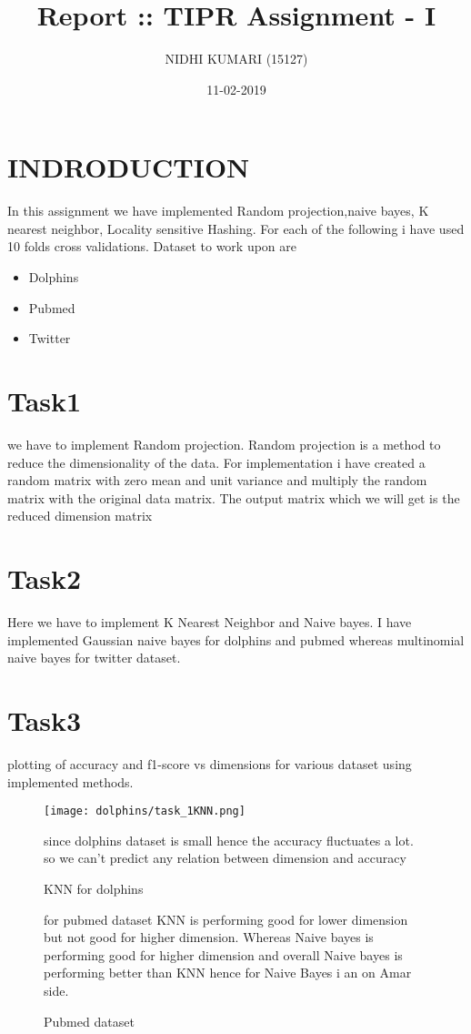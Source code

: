 \documentclass{article}
\title{Report :: TIPR Assignment - I}
\author{NIDHI KUMARI (15127)}
\date{11-02-2019}
\begin{document}
\maketitle
\section{INDRODUCTION}
In this assignment we have implemented Random projection,naive bayes, K nearest neighbor, Locality sensitive Hashing. For each of the following i have used 10 folds cross validations.
Dataset to work upon are
\begin{itemize}
  \item Dolphins
  \item Pubmed
  \item Twitter
\end{itemize}


\section{Task1}
we have to implement Random projection.
Random projection is a method to reduce the dimensionality of the data. For implementation i have created a random matrix with zero mean and unit variance and multiply the random matrix with the original data matrix. The output matrix which we will get is the reduced dimension matrix

\section{Task2}
Here we have to implement K Nearest Neighbor and Naive bayes. I have implemented Gaussian naive bayes for dolphins and pubmed whereas multinomial naive bayes for twitter dataset.

\section{Task3}
plotting of accuracy and f1-score vs dimensions for various dataset using implemented methods.

\begin{figure}

\texttt{[image: dolphins/task\_1KNN.png]}
\caption{KNN for dolphins}
since dolphins dataset is small hence the accuracy fluctuates a lot. so we can't predict any relation between dimension and accuracy
\end{figure}



\begin{figure}%
\centering
    \qquad
    \caption{Pubmed dataset}%
    \label{fig:example}%
   
for pubmed dataset KNN is performing good for lower dimension but not good for higher dimension. Whereas Naive bayes is performing good for higher dimension and overall Naive bayes is performing better than KNN hence for Naive Bayes i an on Amar side.
\end{figure}
\end{document}
